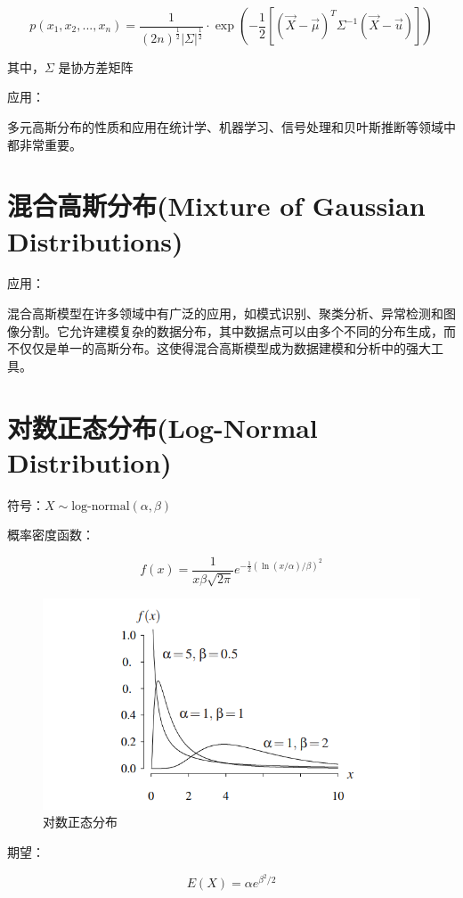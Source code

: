 \documentclass[12pt, a4paper, oneside]{ctexbook}
\begin{document}
$$
p(x_1, x_2, ..., x_n) = \dfrac{1}{(2n)^{\frac{1}{2}}|\Sigma|^{\frac{1}{2}}} \cdot \exp(-\dfrac{1}{2}\left[(\vec{X} - \vec{\mu})^{T}\Sigma^{-1}(\vec{X} - \vec{u})\right])
$$

其中，$\Sigma$ 是协方差矩阵

 应用：
 
 多元高斯分布的性质和应用在统计学、机器学习、信号处理和贝叶斯推断等领域中都非常重要。

\section{混合高斯分布(Mixture of Gaussian Distributions)}


 应用：

混合高斯模型在许多领域中有广泛的应用，如模式识别、聚类分析、异常检测和图像分割。它允许建模复杂的数据分布，其中数据点可以由多个不同的分布生成，而不仅仅是单一的高斯分布。这使得混合高斯模型成为数据建模和分析中的强大工具。

\section{对数正态分布(Log-Normal Distribution)}

 符号：$X \sim \text{log-normal}(\alpha, \beta)$

 概率密度函数：

$$
f(x) = \dfrac{1}{x\beta \sqrt{2\pi}}e^{-\frac{1}{2}(\ln(x / \alpha) / \beta)^{2}}
$$

\begin{figure}[H]
  \centering
  \includegraphics[width=1\textwidth]{image/对数正态分布.png}
  \caption{对数正态分布}
  \label{fig:example}
\end{figure}

 期望：

$$
E(X) = \alpha e^{\beta^2 / 2}
$$
\end{document}
